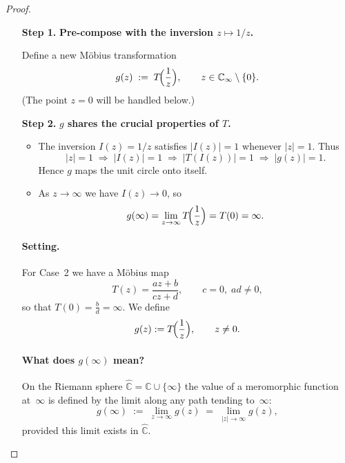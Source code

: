 \documentclass[12pt]{article}
\theoremstyle{definition} %
\theoremstyle{plain} %
\begin{document}
\begin{proof}
\begin{enumerate}
\item[\textbf{Step 1.}] \textbf{Pre-compose with the inversion $z\mapsto 1/z$.}

Define a new Möbius transformation
\[
    g(z)\;:=\;T\!\Bigl(\frac{1}{z}\Bigr),
    \qquad z\in\mathbb{{C}}_\infty\setminus\{0\}.
\]
(The point $z=0$ will be handled below.)

\vspace{4pt}
\item[\textbf{Step 2.}] \textbf{$g$ shares the crucial properties of $T$.}

\begin{itemize}
  \item The inversion $I(z)=1/z$ satisfies $|I(z)|=1$ whenever
        $|z|=1$.  Thus
        \[
           |z|=1\;\Longrightarrow\;|I(z)|=1
           \;\Longrightarrow\;|T(I(z))|=1
           \;\Longrightarrow\;|g(z)|=1.
        \]
        Hence $g$ maps the unit circle onto itself.

  \item As $z\to\infty$ we have $I(z)\to0$, so
        \[
            g(\infty)=\lim_{z\to\infty}T\!\Bigl(\frac1z\Bigr)=T(0)=\infty .
        \]
\end{itemize}

\vspace{4pt}
%

\paragraph{Setting.}
For Case~2 we have a Möbius map
\[
   T(z)=\frac{az+b}{cz+d},\qquad c=0,\;ad\neq0,
\]
so that \(\displaystyle T(0)=\frac{b}{d}=\infty\).
We define
\[
   g(z):=T\!\Bigl(\frac1z\Bigr),\qquad z\neq0.
\]

\paragraph{What does \(g(\infty)\) mean?}
On the Riemann sphere \(\widehat{\mathbb{{C}}}=\mathbb{{C}}\cup\{\infty\}\)
the value of a meromorphic function at~\(\infty\) is defined by the
limit along any path tending to~\(\infty\):
\[
   g(\infty)
   \;:=\;\lim_{z\to\infty}g(z)
   \;=\;\lim_{|z|\to\infty}g(z),
\]
provided this limit exists in \(\widehat{\mathbb{{C}}}\).


\end{enumerate}
\end{proof}
\end{document}
